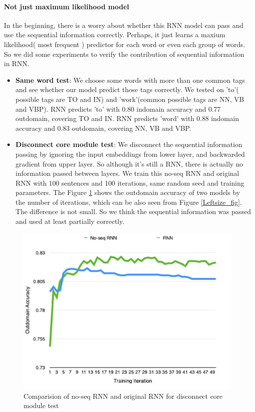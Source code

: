 \documentclass[11pt]{article}
\begin{document}
\paragraph{Not just maximum likelihood model}
In the beginning, there is a worry about whether this RNN model can pass and use the sequential information correctly. Perhaps, it just learns a maxium likelihood( most frequent ) predictor for each word or even each group of words. So we did some experiments to verify the contribution of sequential information in RNN.

\begin{itemize}
\item \textbf{Same word test}:  We choose some words with more than one  common tags and see whether our model predict those tags correctly. We tested on 'to'( possible tags are TO and IN) and 'work'(common possible tags are NN, VB and VBP). RNN predicts 'to' with 0.80 indomain accuracy and 0.77 outdomain, covering TO and IN. RNN predicts 'word' with 0.88 indomain accuracy and 0.83 outdomain, covering NN, VB and VBP.
\item \textbf{Disconnect core module test}: We disconnect the sequential information passing by ignoring the input embeddings from lower layer, and backwarded gradient from upper layer. So although it's still a RNN, there is actually no information passed between layers. We train this no-seq RNN and original RNN with 100 sentences and 100 iterations, same random seed and training parameters. The Figure \ref{Noseq_fig} shows the outdomain accuracy of two models by the number of iterations, which can be also seen from Figure \ref{Leftsize_fig}. The difference is not small. So we think the sequential information was passed and used at least partially correctly.
\end{itemize}
\begin{figure}
\includegraphics[scale=0.5]{outdomain_noseq.png}
\caption{Comparision of no-seq RNN and original RNN for disconnect core module test}\label{Noseq_fig}
\end{figure}
\end{document}
